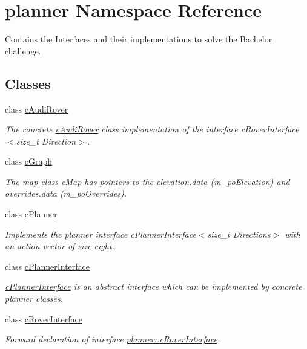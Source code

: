 \hypertarget{namespaceplanner}{}\section{planner Namespace Reference}
\label{namespaceplanner}


Contains the Interfaces and their implementations to solve the Bachelor challenge.  


\subsection*{Classes}
\begin{DoxyCompactItemize}
\item 
class \mbox{\hyperlink{classplanner_1_1c_audi_rover}{c\+Audi\+Rover}}
\begin{DoxyCompactList}\small\item\em The concrete \mbox{\hyperlink{classplanner_1_1c_audi_rover}{c\+Audi\+Rover}} class implementation of the interface c\+Rover\+Interface$<$size\+\_\+t Direction$>$. \end{DoxyCompactList}\item 
class \mbox{\hyperlink{classplanner_1_1c_graph}{c\+Graph}}
\begin{DoxyCompactList}\small\item\em The map class c\+Map has pointers to the elevation.\+data (m\+\_\+po\+Elevation) and overrides.\+data (m\+\_\+po\+Overrides). \end{DoxyCompactList}\item 
class \mbox{\hyperlink{classplanner_1_1c_planner}{c\+Planner}}
\begin{DoxyCompactList}\small\item\em Implements the planner interface c\+Planner\+Interface$<$size\+\_\+t Directions$>$ with an action vector of size eight. \end{DoxyCompactList}\item 
class \mbox{\hyperlink{classplanner_1_1c_planner_interface}{c\+Planner\+Interface}}
\begin{DoxyCompactList}\small\item\em \mbox{\hyperlink{classplanner_1_1c_planner_interface}{c\+Planner\+Interface}} is an abstract interface which can be implemented by concrete planner classes. \end{DoxyCompactList}\item 
class \mbox{\hyperlink{classplanner_1_1c_rover_interface}{c\+Rover\+Interface}}
\begin{DoxyCompactList}\small\item\em Forward declaration of interface \mbox{\hyperlink{classplanner_1_1c_rover_interface}{planner\+::c\+Rover\+Interface}}. \end{DoxyCompactList}\item 

\end{DoxyCompactItemize}
